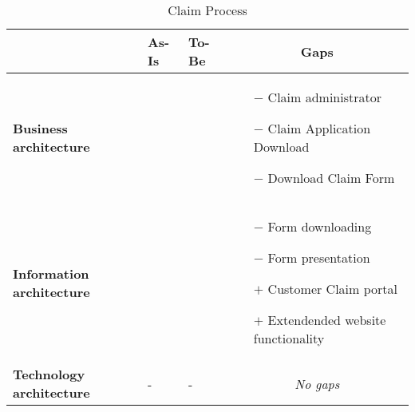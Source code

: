 \begin{table}[H]
	\centering
	\begin{tabular}{|p{2.4cm}|l|l|p{7.5cm}|}
		\hline
		\textbf{} & \textbf{As-Is} & \textbf{To-Be} & \multicolumn{1}{c|}{\textbf{Gaps}} \\ \hline
		\textbf{Business architecture} &  &  & \begin{itemize} \vspace{-0.5cm}
		\item[$-$] Claim administrator
		\item[$-$] Claim Application Download
		\item[$-$] Download Claim Form
		\end{itemize} \vspace{-0.7cm}\\ \hline 

		\textbf{Information architecture} &  & & \begin{itemize}\vspace{-0.5cm}
		\item[$-$] Form downloading
		\item[$-$] Form presentation
		\item[$+$] Customer Claim portal
		\item[$+$] Extendended website functionality
		\end{itemize}\vspace{-0.7cm} \\ \hline

		\textbf{Technology architecture} & - & - & \multicolumn{1}{c|}{\emph{No gaps}} \\ \hline
	\end{tabular}	
	\caption{Claim Process}
	\label{table:gaps_claim}
\end{table}


